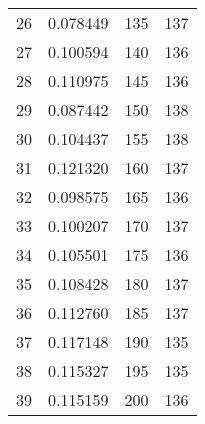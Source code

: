 \begin{tabular}{lrrr}
26 &      0.078449 &              135 &          137 \\
27 &      0.100594 &              140 &          136 \\
28 &      0.110975 &              145 &          136 \\
29 &      0.087442 &              150 &          138 \\
30 &      0.104437 &              155 &          138 \\
31 &      0.121320 &              160 &          137 \\
32 &      0.098575 &              165 &          136 \\
33 &      0.100207 &              170 &          137 \\
34 &      0.105501 &              175 &          136 \\
35 &      0.108428 &              180 &          137 \\
36 &      0.112760 &              185 &          137 \\
37 &      0.117148 &              190 &          135 \\
38 &      0.115327 &              195 &          135 \\
39 &      0.115159 &              200 &          136 \\
\bottomrule
\end{tabular}
